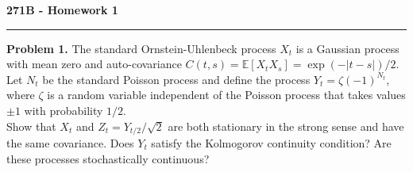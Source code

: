 \documentclass[11pt,letterpaper]{report}
\newcommand{\E}{\mathbb{E}}
\begin{document}
\begin{center}
{\bf \Large 271B - Homework 1}
\vspace{0.2cm}
\hrule
\end{center}

\noindent\textbf{Problem 1. }The standard Ornstein-Uhlenbeck process $X_t$ is a Gaussian process with mean zero and auto-covariance $C(t, s) = \E[X_tX_s] = \exp(-|t-s|)/2$. Let $N_t$ be the standard Poisson process and define the process $Y_t = \zeta(-1)^{N_t}$, where $\zeta$ is a random variable independent of the Poisson process that takes values $\pm 1$ with probability $1/2$.\\

\noindent Show that $X_t$ and $Z_t = Y_{t/2}/\sqrt{2}$ are both stationary in the strong sense and have the same covariance. Does $Y_t$ satisfy the Kolmogorov continuity condition? Are these processes stochastically continuous?
\end{document}
